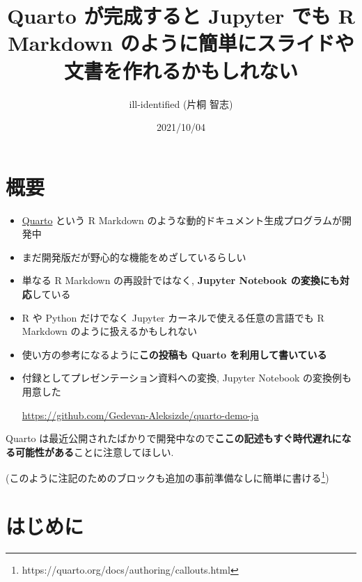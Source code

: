 \documentclass[
  letterpaper,
  DIV=11,
  pandoc,
  ja=standard,
  jafont=noto-otf]{bxjsarticle}
\title{Quarto が完成すると Jupyter でも R Markdown
のように簡単にスライドや文書を作れるかもしれない}
\author{ill-identified (片桐 智志)}
\date{2021/10/04}
\begin{document}
\maketitle

{
\hypersetup{linkcolor=}
\setcounter{tocdepth}{3}
\tableofcontents
}
\hypertarget{ux6982ux8981}{%
\section*{概要}\label{ux6982ux8981}}

\begin{itemize}
\item
  \href{https://quarto.org/}{Quarto} という R Markdown
  のような動的ドキュメント生成プログラムが開発中
\item
  まだ開発版だが野心的な機能をめざしているらしい
\item
  単なる R Markdown の再設計ではなく, \textbf{Jupyter Notebook
  の変換にも対応}している
\item
  R や Python だけでなく Jupyter カーネルで使える任意の言語でも R
  Markdown のように扱えるかもしれない
\item
  使い方の参考になるように\textbf{この投稿も Quarto
  を利用して書いている}
\item
  付録としてプレゼンテーション資料への変換, Jupyter Notebook
  の変換例も用意した

  \url{https://github.com/Gedevan-Aleksizde/quarto-demo-ja}
\end{itemize}

\begin{tcolorbox}[left=2mm, titlerule=0mm, colback=white, bottomrule=.15mm, toptitle=1mm, colframe=quarto-callout-caution-color, bottomtitle=1mm, title=\textcolor{quarto-callout-caution-color}{\faFire}\hspace{0.5em}注意, toprule=.15mm, arc=.35mm, leftrule=.75mm, coltitle=black, rightrule=.15mm, colbacktitle=quarto-callout-caution-color!10!white]
Quarto
は最近公開されたばかりで開発中なので\textbf{ここの記述もすぐ時代遅れになる可能性がある}ことに注意してほしい.

(このように注記のためのブロックも追加の事前準備なしに簡単に書ける\footnote{https://quarto.org/docs/authoring/callouts.html})
\end{tcolorbox}

\hypertarget{ux306fux3058ux3081ux306b}{%
\section{はじめに}\label{ux306fux3058ux3081ux306b}}
\end{document}
